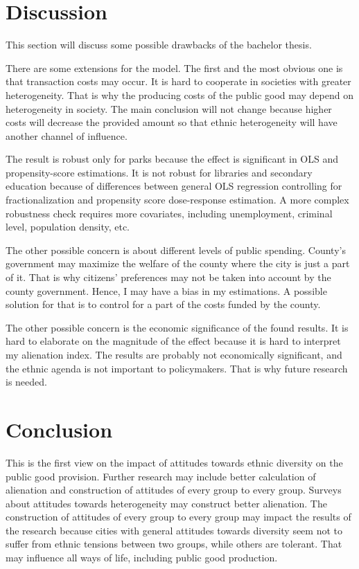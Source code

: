 \documentclass[12pt]{article}
\begin{document}
\section{Discussion}
\label{sec: discussion}

This section will discuss some possible drawbacks of the bachelor thesis.

There are some extensions for the model. The first and the most obvious one is that transaction costs may occur. It is hard to cooperate in societies with greater heterogeneity. That is why the producing costs of the public good may depend on heterogeneity in society. The main conclusion will not change because higher costs will decrease the provided amount so that ethnic heterogeneity will have another channel of influence.

The result is robust only for parks because the effect is significant in OLS and propensity-score estimations. It is not robust for libraries and secondary education because of differences between general OLS regression controlling for fractionalization and propensity score dose-response estimation. A more complex robustness check requires more covariates, including unemployment, criminal level, population density, etc.  

The other possible concern is about different levels of public spending. County's government may maximize the welfare of the county where the city is just a part of it. That is why citizens' preferences may not be taken into account by the county government. Hence, I may have a bias in my estimations. A possible solution for that is to control for a part of the costs funded by the county.

The other possible concern is the economic significance of the found results. It is hard to elaborate on the magnitude of the effect because it is hard to interpret my alienation index. The results are probably not economically significant, and the ethnic agenda is not important to policymakers. That is why future research is needed.


\section{Conclusion}
\label{sec: conclusion}

This is the first view on the impact of attitudes towards ethnic diversity on the public good provision. Further research may include better calculation of alienation and construction of attitudes of every group to every group. Surveys about attitudes towards heterogeneity may construct better alienation. The construction of attitudes of every group to every group may impact the results of the research because cities with general attitudes towards diversity seem not to suffer from ethnic tensions between two groups, while others are tolerant. That may influence all ways of life, including public good production.
\newpage
\end{document}
